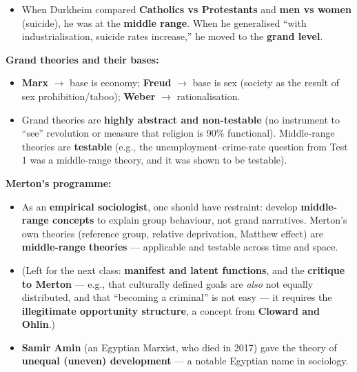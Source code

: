 \begin{ExampleBox}
\begin{itemize}
\item When Durkheim compared \textbf{Catholics vs Protestants} and \textbf{men vs women} (suicide), he was at the \textbf{middle range}. When he generalised ``with industrialisation, suicide rates increase,'' he moved to the \textbf{grand level}.
\end{itemize}
\end{ExampleBox}

\begin{KeyConcept}
\textbf{Grand theories and their bases:}
\begin{itemize}
\item \textbf{Marx} $\rightarrow$ base is economy; \textbf{Freud} $\rightarrow$ base is sex (society as the result of sex prohibition/taboo); \textbf{Weber} $\rightarrow$ rationalisation.
\item Grand theories are \textbf{highly abstract and non-testable} (no instrument to ``see'' revolution or measure that religion is 90\% functional). Middle-range theories are \textbf{testable} (e.g., the unemployment--crime-rate question from Test 1 was a middle-range theory, and it was shown to be testable).
\end{itemize}
\end{KeyConcept}

\begin{CriticalPoint}
\textbf{Merton's programme:}
\begin{itemize}
\item As an \textbf{empirical sociologist}, one should have restraint: develop \textbf{middle-range concepts} to explain group behaviour, not grand narratives. Merton's own theories (reference group, relative deprivation, Matthew effect) are \textbf{middle-range theories} --- applicable and testable across time and space.
\item (Left for the next class: \textbf{manifest and latent functions}, and the \textbf{critique to Merton} --- e.g., that culturally defined goals are \textit{also} not equally distributed, and that ``becoming a criminal'' is not easy --- it requires the \textbf{illegitimate opportunity structure}, a concept from \textbf{Cloward and Ohlin}.)
\end{itemize}
\end{CriticalPoint}

\begin{DataFact}
\begin{itemize}
\item \textbf{Samir Amin} (an Egyptian Marxist, who died in 2017) gave the theory of \textbf{unequal (uneven) development} --- a notable Egyptian name in sociology.
\end{itemize}
\end{DataFact}

